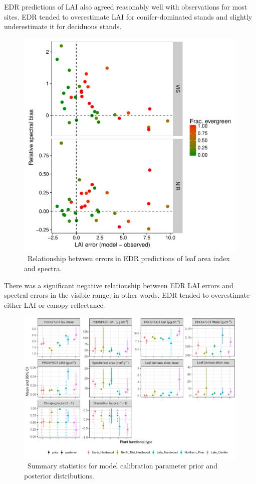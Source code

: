 EDR predictions of LAI also agreed reasonably well with observations for most sites.
EDR tended to overestimate LAI for conifer-dominated stands and slightly underestimate it for deciduous stands.

\begin{figure}
  \centering
  \includegraphics[width=\textwidth]{figures/spec_lai.pdf}
  \caption{\
    Relationship between errors in EDR predictions of leaf area index and spectra.
  }\label{fig:spec_lai}
\end{figure}

There was a significant negative relationship between EDR LAI errors and spectral errors in the visible range;
in other words, EDR tended to overestimate either LAI or canopy reflectance.

\begin{figure}
  \centering
  \includegraphics[width=\textwidth]{figures/pda_summary.pdf}
  \caption{\
    Summary statistics for model calibration parameter prior and posterior distributions.
  }\label{fig:pda_posteriors}
\end{figure}

